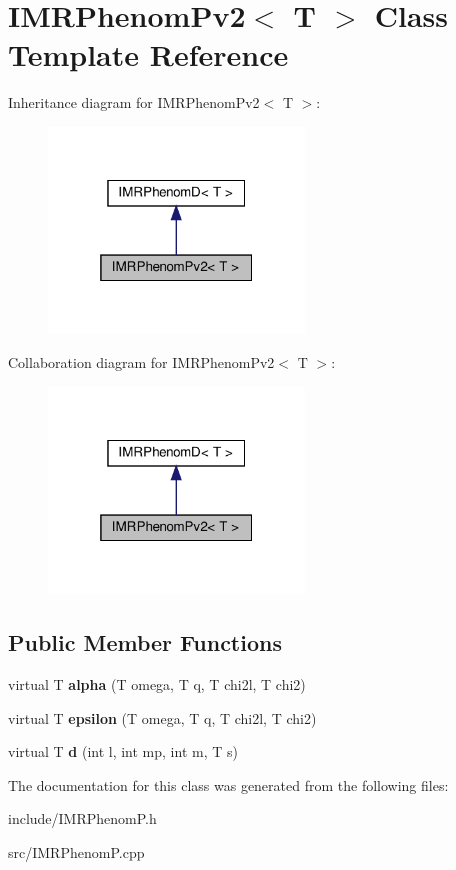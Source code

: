\hypertarget{classIMRPhenomPv2}{}\section{I\+M\+R\+Phenom\+Pv2$<$ T $>$ Class Template Reference}
\label{classIMRPhenomPv2}


Inheritance diagram for I\+M\+R\+Phenom\+Pv2$<$ T $>$\+:\nopagebreak
\begin{figure}[H]
\begin{center}
\leavevmode
\includegraphics[width=193pt]{classIMRPhenomPv2__inherit__graph}
\end{center}
\end{figure}


Collaboration diagram for I\+M\+R\+Phenom\+Pv2$<$ T $>$\+:\nopagebreak
\begin{figure}[H]
\begin{center}
\leavevmode
\includegraphics[width=193pt]{classIMRPhenomPv2__coll__graph}
\end{center}
\end{figure}
\subsection*{Public Member Functions}
\begin{DoxyCompactItemize}
\item 
\mbox{\label{classIMRPhenomPv2_ae3a484c9f30a94cde0fd996e164e1f7d}} 
virtual T {\bfseries alpha} (T omega, T q, T chi2l, T chi2)
\item 
\mbox{\label{classIMRPhenomPv2_a5fff973809492fa59aff6d7d44a2b37a}} 
virtual T {\bfseries epsilon} (T omega, T q, T chi2l, T chi2)
\item 
\mbox{\label{classIMRPhenomPv2_a61b485a13745066477875a4b192dd940}} 
virtual T {\bfseries d} (int l, int mp, int m, T s)
\end{DoxyCompactItemize}


The documentation for this class was generated from the following files\+:\begin{DoxyCompactItemize}
\item 
include/I\+M\+R\+Phenom\+P.\+h\item 
src/I\+M\+R\+Phenom\+P.\+cpp\end{DoxyCompactItemize}
